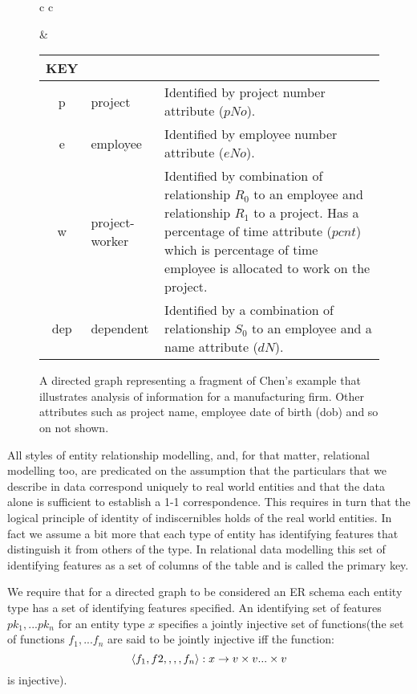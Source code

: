 \documentclass[10pt,a4paper]{article}
\newcommand{\veee}{v}
\begin{document}
\begin{figure} [h]  %
\begin{center}
\begin{tabular}{c c}
\barsfalse %

& \footnotesize
\begin{tabular}{c p{1.5cm} p{4cm}}
KEY && \\
\hline
p & project & Identified by project number attribute ($pNo$).\\
e & employee & Identified by employee number attribute ($eNo$). \\
w  & project-worker & Identified by combination of relationship $R_0$ to an employee and relationship $R_1$ to a project. Has a percentage of time attribute ($pcnt$) which is percentage of time employee is allocated to work on the project.\\
dep & dependent & Identified by a combination of relationship $S_0$ to an employee and a name attribute ($dN$).\\
\end{tabular} 
\end{tabular}
\end{center}
\caption{A directed graph representing a fragment of Chen's example that illustrates analysis of information for a manufacturing firm. Other attributes such as project name, employee date of birth (dob) and so on not shown.}
\label{chenfragmentSANSbars}
\end{figure}

All styles of entity relationship modelling, and, for that matter, relational modelling too, are 
predicated on the assumption that the particulars that we describe in data 
correspond uniquely to real world entities and that the data 
alone is sufficient to establish a 1-1 correspondence. 
This requires in turn that the logical principle of identity of 
indiscernibles holds of the real world entities. In fact we assume a bit more 
that each type of entity has identifying features that distinguish it from  
others of the type. 
In relational data modelling this set of identifying features as a set of columns of the table and is called the primary key.  

We require that 
for a directed graph to be considered an ER schema each entity type has a set of identifying features
 specified. 
An identifying set of features  $pk_1,...pk_n$ for an entity type $x$ specifies a jointly injective set of functions(the set of functions $f_1,...f_n$ are said to be jointly injective iff the function:
$$
\tuple{f_1,f2,,,,f_n}: x \morph \veee \times \veee ... \times \veee
$$
is injective).
\end{document}
